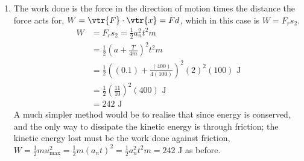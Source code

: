 \begin{problem}[A1987PSIIQ9a]
{\begin{enumerate}
	\item The work done is the force in the direction of motion times the distance the force acts for, $W = \vtr{F}\cdot\vtr{x} = Fd$, which in this case is $W = F_{r}s_{2}$.
\begin{align*} 
W &= F_{r}s_{2} = \frac{1}{2} a_{n}^{2} t^{2} m \\ 
	&= \frac{1}{2} \left( a +\frac{T}{4m} \right)^{2} t^{2} m \\
	&= \frac{1}{2} \left( (0.1) + \frac{(400)}{4(100)} \right)^{2} (2)^{2} (100) \text{ J} \\
	&= \frac{1}{2} \left( \frac{11}{10} \right)^{2} (400) \text{ J} \\
	&= 242 \text{ J}
	\end{align*}
A much simpler method would be to realise that since energy is conserved, and the only way to dissipate the kinetic energy is through friction; the kinetic energy lost must be the work done against friction, $W = \frac{1}{2}mu_{\text{max}}^{2} = \frac{1}{2}m \left( a_{n} t \right)^{2} = \frac{1}{2} a_{n}^{2} t^{2} m = 242 \text{ J}$ as before.
\end{enumerate}}
\end{problem}
